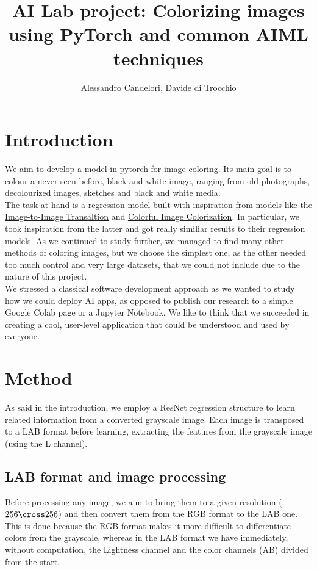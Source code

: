 \documentclass{article}
\title{AI Lab project: Colorizing images using PyTorch and common AIML techniques  }
\author{Alessandro Candelori, Davide di Trocchio}
\begin{document}
\maketitle
\newpage
\tableofcontents
\newpage


\section{Introduction}
We aim to develop a model in pytorch for image coloring. Its main goal is to colour a never seen 
before, black and white image, ranging from old photographs, decolourized images, sketches and 
black and white media. 
\\ 
The task at hand is a regression model built with inspiration from models like the 
\href{https://arxiv.org/pdf/1611.07004.pdf}{Image-to-Image Transaltion}
and 
\href{https://arxiv.org/pdf/1603.08511.pdf}{Colorful Image Colorization}. 
In particular, we took inspiration from the latter and got really similiar results to their regression
models. 
As we continued to study further, we managed to find many other methods of coloring images, but 
we choose the simplest one, as the other needed too much control and very large datasets, that 
we could not include due to the nature of this project. 
\\
We stressed a classical software development approach as we wanted to study how we could deploy 
AI apps, as opposed to publish our research to a simple Google Colab page or a Jupyter Notebook. 
We like to think that we succeeded in creating a cool, user-level application that could be 
understood and used by everyone. 

\section{Method}
As said in the introduction, we employ a ResNet regression structure to learn related information
from a converted grayscale image. Each image is transposed to a LAB format before learning, extracting 
the features from the grayscale image (using the L channel).

\subsection{LAB format and image processing}
Before processing any image, we aim to bring them to a given resolution ($256 \cross 256$) and then 
convert them from the RGB format to the LAB one. This is done because the RGB format makes it more 
difficult to differentiate colors from the grayscale, whereas in the LAB format we have 
immediately, without computation, the Lightness channel and the color channels (AB) divided from the 
start. 
\end{document}
